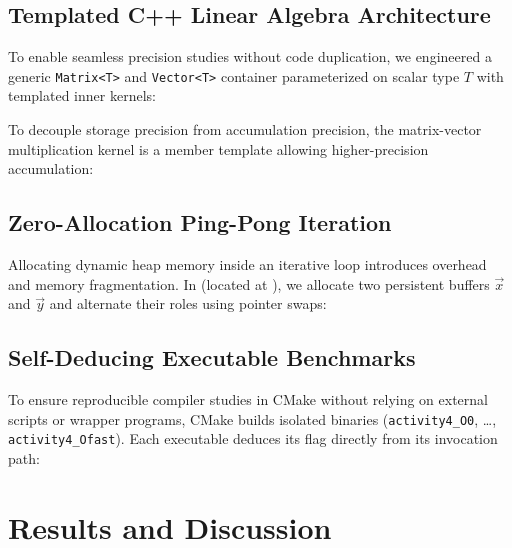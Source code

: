 \documentclass[11pt,a4paper]{article}
\begin{document}
\subsection{Templated C++ Linear Algebra Architecture}
To enable seamless precision studies without code duplication, we engineered a generic \texttt{Matrix<T>} and \texttt{Vector<T>} container parameterized on scalar type $T$ with templated inner kernels:


To decouple storage precision from accumulation precision, the matrix-vector multiplication kernel is a member template allowing higher-precision accumulation:


\subsection{Zero-Allocation Ping-Pong Iteration}
Allocating dynamic heap memory inside an iterative loop introduces overhead and memory fragmentation. In  (located at ), we allocate two persistent buffers $\vec{x}$ and $\vec{y}$ and alternate their roles using pointer swaps:


\subsection{Self-Deducing Executable Benchmarks}
To ensure reproducible compiler studies in CMake without relying on external scripts or wrapper programs, CMake builds isolated binaries (\texttt{activity4\_O0}, \dots, \texttt{activity4\_Ofast}). Each executable deduces its flag directly from its invocation path:


\section{Results and Discussion}
\end{document}
